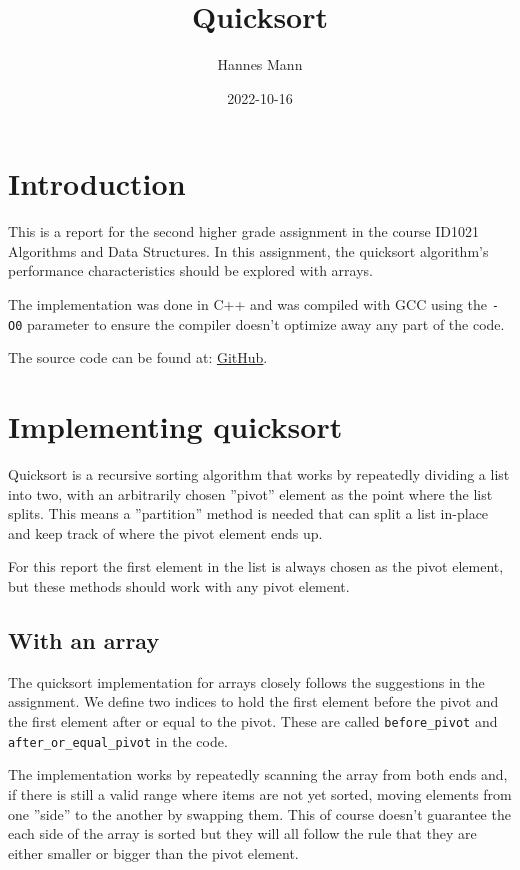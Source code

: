 \documentclass[a4paper,11pt]{article}
\begin{document}
\title{
    \textbf{Quicksort}
}
\author{Hannes Mann}
\date{2022-10-16}

\maketitle

\section*{Introduction}

This is a report for the second higher grade assignment in the course ID1021 Algorithms and Data Structures.
In this assignment, the quicksort algorithm's performance characteristics should be explored with arrays.

The implementation was done in C++ and was compiled with GCC using the {\tt -O0} parameter to ensure the compiler doesn't optimize away any part of the code.

The source code can be found at: \href{https://github.com/hannesmann/ID1021/tree/04c951009ff796b267d84efad875b24ab77aa892/src/quicksort}{GitHub}.

\section*{Implementing quicksort}

Quicksort is a recursive sorting algorithm that works by repeatedly dividing a list into two, with an arbitrarily chosen ''pivot'' element as the point where the list splits.
This means a ''partition'' method is needed that can split a list in-place and keep track of where the pivot element ends up.

For this report the first element in the list is always chosen as the pivot element, but these methods should work with any pivot element.

\subsection*{With an array}

The quicksort implementation for arrays closely follows the suggestions in the assignment.
We define two indices to hold the first element before the pivot and the first element after or equal to the pivot.
These are called \texttt{before_pivot} and \texttt{after_or_equal_pivot} in the code.

The implementation works by repeatedly scanning the array from both ends and, if there is still a valid range where items are not yet sorted, moving elements from one ''side'' to the another by swapping them.
This of course doesn't guarantee the each side of the array is sorted but they will all follow the rule that they are either smaller or bigger than the pivot element.
\end{document}
